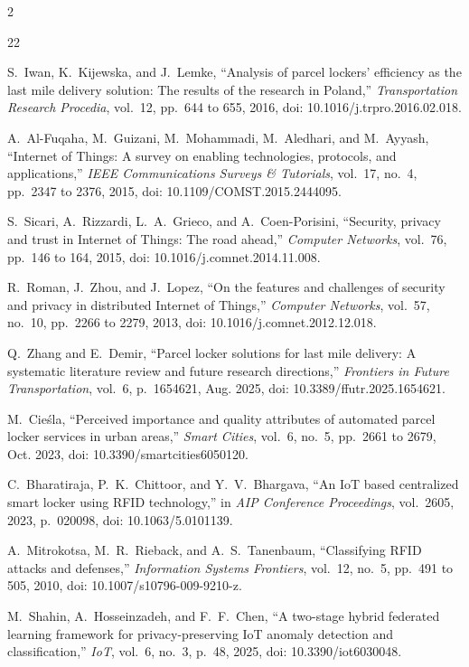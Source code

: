 \documentclass[journal,onecolumn]{IEEEtran}
\begin{document}
\begin{multicols}{2}
\begin{thebibliography}{22}

S.~Iwan, K.~Kijewska, and J.~Lemke, ``Analysis of parcel lockers' efficiency as the last mile delivery solution: The results of the research in Poland,'' \emph{Transportation Research Procedia}, vol.~12, pp.~644 to 655, 2016, doi: 10.1016/j.trpro.2016.02.018.

A.~Al-Fuqaha, M.~Guizani, M.~Mohammadi, M.~Aledhari, and M.~Ayyash, ``Internet of Things: A survey on enabling technologies, protocols, and applications,'' \emph{IEEE Communications Surveys \& Tutorials}, vol.~17, no.~4, pp.~2347 to 2376, 2015, doi: 10.1109/COMST.2015.2444095.

S.~Sicari, A.~Rizzardi, L.~A.~Grieco, and A.~Coen-Porisini, ``Security, privacy and trust in Internet of Things: The road ahead,'' \emph{Computer Networks}, vol.~76, pp.~146 to 164, 2015, doi: 10.1016/j.comnet.2014.11.008.

R.~Roman, J.~Zhou, and J.~Lopez, ``On the features and challenges of security and privacy in distributed Internet of Things,'' \emph{Computer Networks}, vol.~57, no.~10, pp.~2266 to 2279, 2013, doi: 10.1016/j.comnet.2012.12.018.

Q.~Zhang and E.~Demir, ``Parcel locker solutions for last mile delivery: A systematic literature review and future research directions,'' \emph{Frontiers in Future Transportation}, vol.~6, p.~1654621, Aug. 2025, doi: 10.3389/ffutr.2025.1654621.

M.~Cie{\'s}la, ``Perceived importance and quality attributes of automated parcel locker services in urban areas,'' \emph{Smart Cities}, vol.~6, no.~5, pp.~2661 to 2679, Oct. 2023, doi: 10.3390/smartcities6050120.

C.~Bharatiraja, P.~K.~Chittoor, and Y.~V.~Bhargava, ``An IoT based centralized smart locker using RFID technology,'' in \emph{AIP Conference Proceedings}, vol.~2605, 2023, p.~020098, doi: 10.1063/5.0101139.

A.~Mitrokotsa, M.~R.~Rieback, and A.~S.~Tanenbaum, ``Classifying RFID attacks and defenses,'' \emph{Information Systems Frontiers}, vol.~12, no.~5, pp.~491 to 505, 2010, doi: 10.1007/s10796-009-9210-z.

M.~Shahin, A.~Hosseinzadeh, and F.~F.~Chen, ``A two-stage hybrid federated learning framework for privacy-preserving IoT anomaly detection and classification,'' \emph{IoT}, vol.~6, no.~3, p.~48, 2025, doi: 10.3390/iot6030048.


\end{thebibliography}
\end{multicols}
\end{document}
